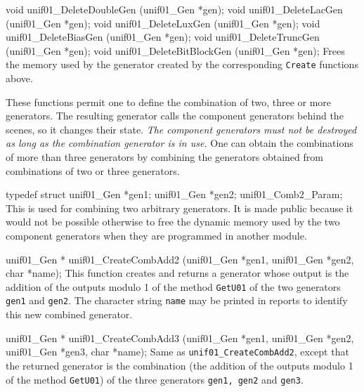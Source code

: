 void unif01_DeleteDoubleGen (unif01_Gen *gen);
void unif01_DeleteLacGen    (unif01_Gen *gen);
void unif01_DeleteLuxGen    (unif01_Gen *gen);
void unif01_DeleteBiasGen   (unif01_Gen *gen);
void unif01_DeleteTruncGen  (unif01_Gen *gen);
void unif01_DeleteBitBlockGen (unif01_Gen *gen);
\endcode
 \tab Frees the memory used by the generator created by the corresponding
 {\tt Create} functions above.
 \endtab




These functions permit one to define the combination of two, three 
or more generators. The resulting generator calls
% 
the component generators behind the scenes, so it changes their
state. \emph{The  component generators must not be destroyed as long as the
 combination generator is in use.}
One can obtain the combinations of more than three generators by combining
the generators obtained from combinations of two or three generators.
%
\hide
\code

typedef struct {
   unif01_Gen *gen1;
   unif01_Gen *gen2;
} unif01_Comb2_Param;
\endcode 
 \tab This is used for combining two arbitrary generators. It is made
  public because it would not be possible otherwise to free the dynamic
  memory used by the two component generators when they are programmed
  in another module.
  \endtab
\endhide
\code


unif01_Gen * unif01_CreateCombAdd2 (unif01_Gen *gen1, unif01_Gen *gen2,
                                    char *name);
\endcode
 \tab  This function creates and returns a generator whose output is the
 addition of the outputs modulo 1 of the  method {\tt GetU01} of the 
 two generators {\tt gen1} and {\tt gen2}.
 The character string {\tt name} may be printed in reports to identify this
 new combined  generator.
 \endtab
\code


unif01_Gen * unif01_CreateCombAdd3 (unif01_Gen *gen1, unif01_Gen *gen2,
                                    unif01_Gen *gen3, char *name);
\endcode
 \tab  Same as {\tt unif01\_CreateCombAdd2}, except that the returned
  generator is the combination (the addition of the outputs modulo 1 of the
  method {\tt GetU01}) of the three generators {\tt gen1, gen2} and {\tt gen3}.
 \endtab
\code


